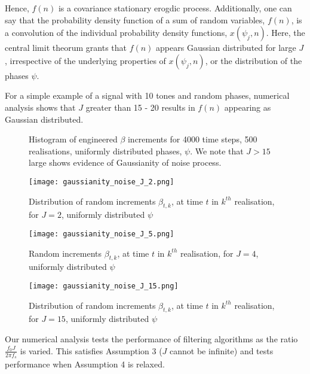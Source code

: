 Hence, $f(n)$ is a covariance stationary erogdic process. Additionally, one can say that the probability density function of a sum of random variables, $f(n)$, is a convolution of the individual probability density functions,   $x(\psi_j, n)$. Here, the central limit theorum grants that $f(n)$ appears Gaussian distributed for large $J$, irrespective of the underlying properties of $x(\psi_j, n)$, or the distribution of the phases $\psi$. 

For a simple example of a signal with 10 tones and random phases, numerical analysis shows that $J$ greater than 15 - 20 results in $f(n)$ appearing as Gaussian distributed. 

\begin{figure}[h!]
	\centering
	\caption[Assumptions for Stochastic Processes: Gaussian engineered noise processes]{Histogram of engineered $\beta$ increments for 4000 time steps, 500 realisations, uniformly distributed phases, $\psi$. We note that $J>15$ large shows evidence of Gaussianity of noise process. }
		\texttt{[image: gaussianity\_noise\_J\_2.png]}
		\caption{ Distribution of random increments $\beta_{t,k}$, at time $t$ in $k^{th}$ realisation, for $J=2$, uniformly distributed $\psi$ } \label{fig:gaussianity_noise_J_2}
		\texttt{[image: gaussianity\_noise\_J\_5.png]}
		\caption{ Random increments $\beta_{t,k}$, at time $t$ in $k^{th}$ realisation, for $J=4$, uniformly distributed $\psi$ } \label{fig:gaussianity_noise_J_5}
		\texttt{[image: gaussianity\_noise\_J\_15.png]}
		\caption{ Distribution of random increments $\beta_{t,k}$, at time $t$ in $k^{th}$ realisation, for $J=15$, uniformly distributed $\psi$ } \label{fig:gaussianity_noise_J_15}
\end{figure}

Our numerical analysis tests the performance of filtering algorithms as the ratio $\frac{f_0 J}{2 \pi f_s}$ is varied. This satisfies Assumption 3 ($J$ cannot be infinite) and tests performance when Assumption 4 is relaxed.